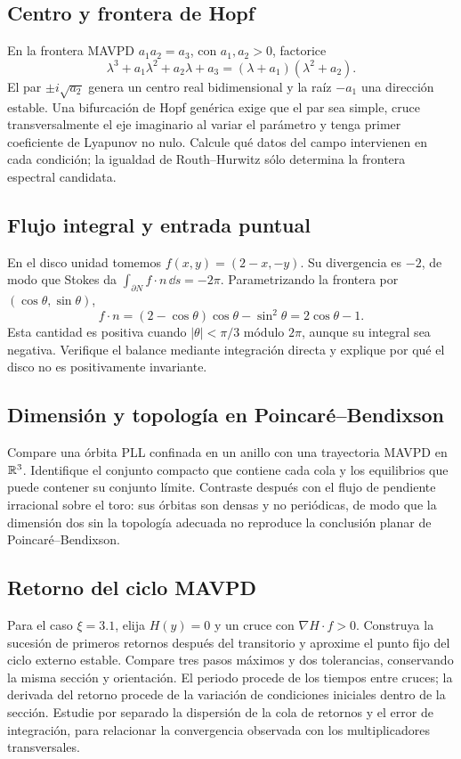 \subsection{Centro y frontera de Hopf}
En la frontera MAVPD \(a_1a_2=a_3\), con \(a_1,a_2>0\), factorice
\[
 \lambda^3+a_1\lambda^2+a_2\lambda+a_3
 =(\lambda+a_1)(\lambda^2+a_2).
\]
El par \(\pm i\sqrt{a_2}\) genera un centro real bidimensional y la raíz
\(-a_1\) una dirección estable. Una bifurcación de Hopf genérica exige que
el par sea simple, cruce transversalmente el eje imaginario al variar el
parámetro y tenga primer coeficiente de Lyapunov no nulo. Calcule qué datos
del campo intervienen en cada condición; la igualdad de Routh--Hurwitz sólo
determina la frontera espectral candidata.

\subsection{Flujo integral y entrada puntual}
En el disco unidad tomemos \(f(x,y)=(2-x,-y)\). Su divergencia es \(-2\),
de modo que Stokes da \(\int_{\partial N}f\cdot n\,\dd s=-2\pi\).
Parametrizando la frontera por \((\cos\theta,\sin\theta)\),
\[
 f\cdot n=(2-\cos\theta)\cos\theta-\sin^2\theta
 =2\cos\theta-1.
\]
Esta cantidad es positiva cuando \(|\theta|<\pi/3\) módulo \(2\pi\),
aunque su integral sea negativa. Verifique el balance mediante integración
directa y explique por qué el disco no es positivamente invariante.

\subsection{Dimensión y topología en Poincaré--Bendixson}
Compare una órbita PLL confinada en un anillo con una trayectoria MAVPD en
\(\mathbb{R}^3\). Identifique el conjunto compacto que contiene cada cola y los
equilibrios que puede contener su conjunto límite. Contraste después con el
flujo de pendiente irracional sobre el toro: sus órbitas son densas y no
periódicas, de modo que la dimensión dos sin la topología adecuada no
reproduce la conclusión planar de Poincaré--Bendixson.

\subsection{Retorno del ciclo MAVPD}
Para el caso \(\xi=3.1\), elija \(H(y)=0\) y un cruce con
\(\nabla H\cdot f>0\). Construya la sucesión de primeros retornos después
del transitorio y aproxime el punto fijo del ciclo externo estable.
Compare tres pasos máximos y dos tolerancias, conservando la misma sección
y orientación. El periodo procede de los tiempos entre cruces; la derivada
del retorno procede de la variación de condiciones iniciales dentro de la
sección. Estudie por separado la dispersión de la cola de retornos y el error
de integración, para relacionar la convergencia observada con los
multiplicadores transversales.

